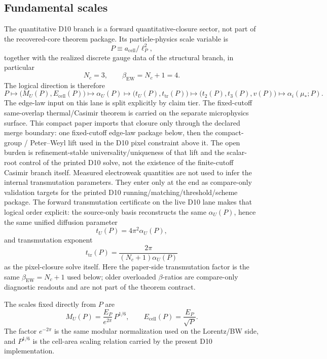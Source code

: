 \documentclass[11pt]{article}
\begin{document}
\subsection{Fundamental scales}

The quantitative D10 branch is a forward quantitative-closure sector, not part of the recovered-core theorem package. Its particle-physics scale variable is
\[
P \equiv a_{\mathrm{cell}}/\ell_P^2,
\]
together with the realized discrete gauge data of the structural branch, in particular
\[
N_c=3,
\qquad
\beta_{\mathrm{EW}}=N_c+1=4.
\]
The logical direction is therefore
\[
P
\longmapsto
\bigl(M_U(P),E_{\mathrm{cell}}(P)\bigr)
\longmapsto
\alpha_U(P)
\longmapsto
\bigl(t_U(P),t_{\mathrm{tr}}(P)\bigr)
\longmapsto
\bigl(t_2(P),t_3(P),v(P)\bigr)
\longmapsto
\alpha_i(\mu_\ast;P).
\]
The edge-law input on this lane is split explicitly by claim tier. The fixed-cutoff
same-overlap thermal/Casimir theorem is carried on the separate microphysics surface. This
compact paper imports that closure only through the declared merge boundary: one fixed-cutoff
edge-law package below, then the compact-group / Peter--Weyl lift used in the D10 pixel
constraint above it. The open burden is refinement-stable universality/uniqueness of
that lift and the scalar-root control of the printed D10 solve, not the existence of the
finite-cutoff Casimir branch itself.
Measured electroweak quantities are not used to infer the internal transmutation parameters. They enter only at the end as compare-only validation targets for the printed D10 running/matching/threshold/scheme package.
The forward transmutation certificate on the live D10 lane makes that logical order explicit: the source-only basis reconstructs the same \(\alpha_U(P)\), hence the same unified diffusion parameter
\[
t_U(P)=4\pi^2\alpha_U(P),
\]
and transmutation exponent
\[
t_{\mathrm{tr}}(P)=\frac{2\pi}{(N_c+1)\alpha_U(P)}
\]
as the pixel-closure solve itself. Here the paper-side transmutation factor is the same
\(\beta_{\mathrm{EW}}=N_c+1\) used below; older overloaded \(\beta\)-ratios are compare-only
diagnostic readouts and are not part of the theorem contract.

The scales fixed directly from \(P\) are
\[
M_U(P)=\frac{E_P}{e^{2\pi}}\,P^{1/6},
\qquad
E_{\mathrm{cell}}(P)=\frac{E_P}{\sqrt P}.
\]
The factor \(e^{-2\pi}\) is the same modular normalization used on the Lorentz/BW side, and \(P^{1/6}\) is the cell-area scaling relation carried by the present D10 implementation.
\end{document}
